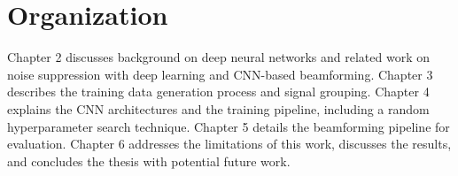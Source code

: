 \section{Organization}
Chapter 2 discusses background on deep neural networks and related work on noise suppression with deep learning and CNN-based beamforming. Chapter 3 describes the training data generation process and signal grouping. Chapter 4 explains the CNN architectures and the training pipeline, including a random hyperparameter search technique. Chapter 5 details the beamforming pipeline for evaluation. Chapter 6 addresses the limitations of this work, discusses the results, and concludes the thesis with potential future work.
